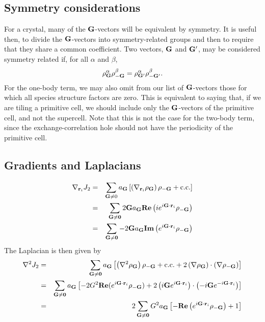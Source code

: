 \subsection{Symmetry considerations}
For a crystal, many of the $\vG$-vectors will be equivalent by
symmetry.  It is useful then, to divide the $\vG$-vectors into
symmetry-related groups and then to require that they share a common
coefficient.  Two vectors, $\vG$ and $\vG'$, may be considered
symmetry related if, for all $\alpha$ and $\beta$,
\begin{equation}
\rho^\alpha_\vG \rho^\beta_{-\vG} = \rho^\alpha_{\vG'} \rho^\beta_{-\vG'}. 
\end{equation}
For the one-body term, we may also omit from our list of $\vG$-vectors
those for which all species structure factors are zero.  This is
equivalent to saying that, if we are tiling a primitive cell, we
should include only the $\vG$-vectors of the primitive cell, and not
the supercell.  Note that this is not the case for the two-body term,
since the exchange-correlation hole should not have the periodicity of
the primitive cell.

\subsection{Gradients and Laplacians}
\begin{eqnarray}
\nabla_{\vr_i} J_2 & = & \sum_{\vG \neq 0} a_\vG \left[\left(\nabla_{\vr_i}\rho_\vG\right) \rho_{-\vG} + \text{c.c.}\right] \\
& = & \sum_{\vG\neq \mathbf{0}} 2\vG a_\vG \mathbf{Re}\left(i e^{i\vG\cdot\vr_i} \rho_{-\vG} \right) \\
& = & \sum_{\vG\neq \mathbf{0}} -2\vG a_\vG\mathbf{Im}\left(e^{i\vG\cdot\vr_i} \rho_{-\vG} \right)
\end{eqnarray}
The Laplacian is then given by
\begin{eqnarray}
  \nabla^2 J_2 & = & \sum_{\vG\neq\mathbf{0}} a_\vG \left[\left(\nabla^2 \rho_\vG\right) \rho_{-\vG} + \text{c.c.} 
  + 2\left(\nabla \rho_\vG)\cdot(\nabla \rho_{-\vG}\right)\right] \\
& = & \sum_{\vG\neq\mathbf{0}} a_\vG \left[ -2G^2\mathbf{Re}(e^{i\vG\cdot\vr_i}\rho_{-\vG}) + 
    2\left(i\vG e^{i\vG\cdot\vr_i}\right) \cdot \left(-i\vG e^{-i\vG\cdot\vr_i}\right)
\right] \\
& = & 2 \sum_{\vG\neq\mathbf{0}} G^2 a_\vG  \left[-\mathbf{Re}\left(e^{i\vG\cdot\vr_i}\rho_{-\vG}\right) + 1\right] 
\end{eqnarray}

